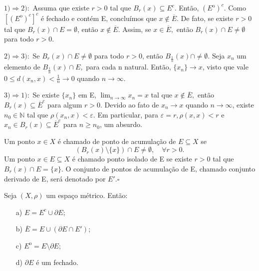 \documentclass[metric_notes.tex]{subfiles}
\begin{document}
\begin{proof*}
	\(1) \Rightarrow 2):\) Assuma que existe \(r > 0\) tal que \(B_{r}(x)\subseteq{E^{c}}\). Então,
	\(({E}^{\mathrm{o}})^{c}.\) Como \([({E}^{\mathrm{o}})^{c}]^{c}\) é fechado e contém E, concluímos que
	\(x\not\in \overline{E}.\) De fato, se existe \(r > 0\) tal que \(B_{r}(x)\cap E = \emptyset\), então \(x\not\in \overline{E}\).
	Assim, se \(x\in \overline{E},\) então \(B_{r}(x)\cap E \neq\emptyset\) para todo \(r > 0\).

	\(2)\Rightarrow 3):\) Se \(B_{r}(x)\cap E \neq\emptyset\) para todo \(r > 0\), então \(B_{\frac{1}{n}}(x)\cap \neq\emptyset.\) Seja
	\(x_{n}\) um elemento de \(B_{\frac{1}{n}}(x)\cap E,\) para cada n natural. Então, \(\{x_{n}\}\rightarrow x\), visto que vale \(0\leq d(x_{n}, x) < \frac{1}{n}\rightarrow 0\)
	quando \(n\rightarrow\infty.\)


	\(3) \Rightarrow 1):\) Se existe \(\{x_{n}\}\) em E, \(\lim_{n\to \infty}x_{n} = x\) tal que \(x\not\in \overline{E},\) então \(B_{r}(x)\subseteq{\overline{E}^{c}}\)
	para algum \(r>0.\) Devido ao fato de \(x_{n}\rightarrow x\) quando \(n\rightarrow \infty\), existe \(n_{0}\in \mathbb{N}\) tal que \(\rho(x_{n}, x) < \varepsilon \).
	Em particular, para \(\varepsilon = r, \rho(x, x) < r\)  e \(x_{n}\in B_{r}(x)\subseteq{\overline{E}^{c}}\) para \(n\geq n_{0}\), um absurdo. \qedsymbol
\end{proof*}
\begin{def*}
	Um ponto \(x\in X\) é chamado de ponto de acumulação de \(E\subseteq{X}\) se
	\[
		(B_{r}(x)\setminus\{x\})\cap E \neq\emptyset,\quad \forall r>0.
	\]
	Um ponto \(x\in E\subseteq{X}\) é chamado ponto isolado de E se existe \(r > 0\) tal que
	\(B_{r}(x)\cap{E} = \{x\}\). O conjunto de pontos de acumulação de E, chamado conjunto derivado
	de E, será denotado por \(E'. \square\)
\end{def*}
\begin{prop*}
	Seja \((X, \rho )\) um espaço métrico. Então:
	\begin{itemize}
		\item[a)] \(E = E^{c}\cup \partial E\);
		\item[b)] \(\overline{E} = E\cup (\partial E\cap E')\);
		\item[c)] \({E}^{\mathrm{o}} = E\setminus{\partial E}\);
		\item[d)] \(\partial E\) é um fechado.
	\end{itemize}
\end{prop*}
\end{document}
